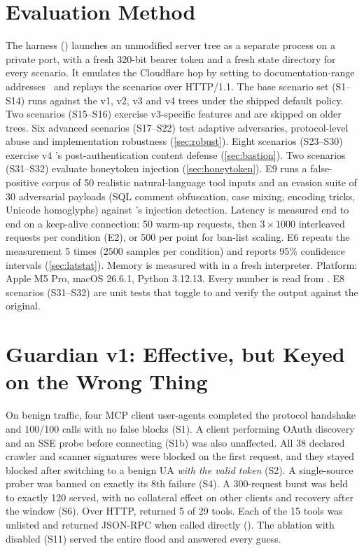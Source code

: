 \documentclass[10pt,twocolumn]{article}
\begin{document}
\section{Evaluation Method}\label{sec:method}
The harness () launches an unmodified server tree
as a separate process on a private port, with a fresh 320-bit bearer token and
a fresh state directory for every scenario. It emulates the Cloudflare hop by
setting  to documentation-range
addresses~\citep{rfc5737,rfc3849} and replays the scenarios over HTTP/1.1. The
base scenario set (S1--S14) runs against the v1, v2, v3 and v4 trees under the
shipped default policy. Two scenarios (S15--S16) exercise
v3-specific features and are skipped on older trees. Six advanced scenarios
(S17--S22) test adaptive adversaries, protocol-level abuse and implementation
robustness (\cref{sec:robust}). Eight scenarios (S23--S30) exercise
v4 \bastion{}'s post-authentication content defense (\cref{sec:bastion}).
Two scenarios (S31--S32) evaluate honeytoken injection (\cref{sec:honeytoken}).
E9 runs a false-positive corpus of 50 realistic natural-language tool inputs
and an evasion suite of 30 adversarial payloads (SQL comment obfuscation,
case mixing, encoding tricks, Unicode homoglyphs) against \bastion{}'s
injection detection.
Latency is measured end to end on a keep-alive connection: 50 warm-up requests,
then $3\times\num{1000}$ interleaved requests per condition (E2), or 500 per
point for ban-list scaling. E6 repeats the measurement 5 times ($\num{2500}$
samples per condition) and reports 95\% confidence intervals
(\cref{sec:latstat}). Memory is measured with  in a fresh
interpreter. Platform: Apple M5 Pro, macOS 26.6.1, Python 3.12.13. Every number
is read from . E8 scenarios
(S31--S32) are unit tests that toggle  to
 and verify the output against the original.

\section{Guardian v1: Effective, but Keyed on the Wrong Thing}\label{sec:v1}

 On benign traffic, four MCP client user-agents
completed the protocol handshake and 100/100 calls with no false blocks (S1).
A client performing OAuth discovery and an SSE probe before connecting (S1b)
was also unaffected. All 38 declared crawler and scanner signatures were
blocked on the first request, and they stayed blocked after switching to a
benign UA \emph{with the valid token} (S2). A single-source prober was banned
on exactly its 8th failure (S4). A 300-request burst was held to exactly 120
served, with no collateral effect on other clients and recovery after the
window (S6). Over HTTP,  returned 5 of 29 tools. Each of the
15  tools was unlisted and returned JSON-RPC 
when called directly (). The ablation with \sys{}
disabled (S11) served the entire flood and answered every guess.
\end{document}
